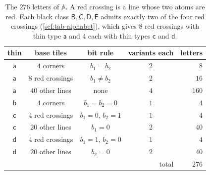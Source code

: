 \begin{table}[ht]
\centering
{}
\caption{Formal parents of an aligned legal $2\times2$ block (\cref{scf:parents}). The count of formal parents uses the $52$ pairs $(\kappa,\omega)$ allowed at child $(0,0)$.}
\label{scf:tab-parents}
\end{table}

\begin{table}[ht]
\centering
\begin{tabular}{c|c|c|c|r}
thin & base tiles & bit rule & variants each & letters\\\hline
$\mathsf a$ & $4$ corners & $b_1=b_2$ & $2$ & $8$\\
$\mathsf a$ & $8$ red crossings & $b_1\ne b_2$ & $2$ & $16$\\
$\mathsf a$ & $40$ other lines & none & $4$ & $160$\\
$\mathsf b$ & $4$ corners & $b_1=b_2=0$ & $1$ & $4$\\
$\mathsf c$ & $4$ red crossings & $b_1=0$, $b_2=1$ & $1$ & $4$\\
$\mathsf c$ & $20$ other lines & $b_1=0$ & $2$ & $40$\\
$\mathsf d$ & $4$ red crossings & $b_1=1$, $b_2=0$ & $1$ & $4$\\
$\mathsf d$ & $20$ other lines & $b_2=0$ & $2$ & $40$\\\hline
\multicolumn{4}{r|}{total} & $276$
\end{tabular}
\caption{The $276$ letters of $\mathbb A$. A red crossing is a line whose two atoms are red. Each black class $\mathsf B,\mathsf C,\mathsf D,\mathsf E$ admits exactly two of the four red crossings (\cref{scf:tab-alphabet}), which gives $8$ red crossings with thin type $\mathsf a$ and $4$ each with thin types $\mathsf c$ and $\mathsf d$.}
\label{scf:tab-letters}
\end{table}


